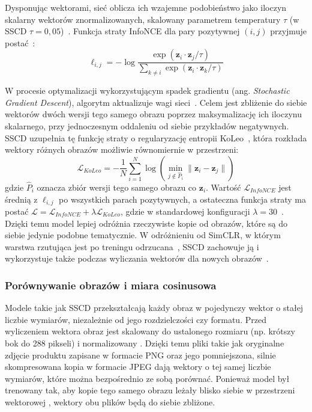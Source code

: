 Dysponując wektorami, sieć oblicza ich wzajemne podobieństwo jako iloczyn skalarny wektorów znormalizowanych, skalowany parametrem temperatury $\tau$ (w SSCD $\tau = 0{,}05$)~\cite{chen2020simclr, pizzi2022sscd}. Funkcja straty InfoNCE dla pary pozytywnej $(i, j)$ przyjmuje postać~\cite{pizzi2022sscd}:
$$\ell_{i,j} = -\log \frac{\exp(\mathbf{z}_i \cdot \mathbf{z}_j / \tau)}{\sum_{k \neq i} \exp(\mathbf{z}_i \cdot \mathbf{z}_k / \tau)}$$


W procesie optymalizacji wykorzystującym spadek gradientu (ang. \textit{Stochastic Gradient Descent}), algorytm aktualizuje wagi sieci~\cite{chen2020simclr}. Celem jest zbliżenie do siebie wektorów dwóch wersji tego samego obrazu poprzez maksymalizację ich iloczynu skalarnego, przy jednoczesnym oddaleniu od siebie przykładów negatywnych. SSCD uzupełnia tę funkcję straty o regularyzację entropii KoLeo~\cite{sablayrolles2019spreading, pizzi2022sscd}, która rozkłada wektory różnych obrazów możliwie równomiernie w przestrzeni:
$$\mathcal{L}_{KoLeo} = -\frac{1}{N} \sum_{i=1}^{N} \log \left( \min_{j \notin \hat{P}_i} \|\mathbf{z}_i - \mathbf{z}_j\| \right)$$
gdzie $\hat{P}_i$ oznacza zbiór wersji tego samego obrazu co $\mathbf{z}_i$. Wartość $\mathcal{L}_{InfoNCE}$ jest średnią z $\ell_{i,j}$ po wszystkich parach pozytywnych, a ostateczna funkcja straty ma postać $\mathcal{L} = \mathcal{L}_{InfoNCE} + \lambda \mathcal{L}_{KoLeo}$, gdzie w standardowej konfiguracji $\lambda = 30$~\cite{pizzi2022sscd}. Dzięki temu model lepiej odróżnia rzeczywiste kopie od obrazów, które są do siebie jedynie podobne tematycznie. W odróżnieniu od SimCLR, w którym warstwa rzutująca jest po treningu odrzucana~\cite{chen2020simclr}, SSCD zachowuje ją i wykorzystuje także podczas wyliczania wektorów dla nowych obrazów~\cite{pizzi2022sscd}.


\subsubsection{Porównywanie obrazów i miara cosinusowa}


Modele takie jak SSCD przekształcają każdy obraz w pojedynczy wektor o stałej liczbie wymiarów, niezależnie od jego rozdzielczości czy formatu. Przed wyliczeniem wektora obraz jest skalowany do ustalonego rozmiaru (np. krótszy bok do 288 pikseli) i normalizowany \cite{sscd_repo}. Dzięki temu pliki takie jak oryginalne zdjęcie produktu zapisane w formacie PNG oraz jego pomniejszona, silnie skompresowana kopia w formacie JPEG dają wektory o tej samej liczbie wymiarów, które można bezpośrednio ze sobą porównać. Ponieważ model był trenowany tak, aby kopie tego samego obrazu leżały blisko siebie w przestrzeni wektorowej \cite{pizzi2022sscd}, wektory obu plików będą do siebie zbliżone.


